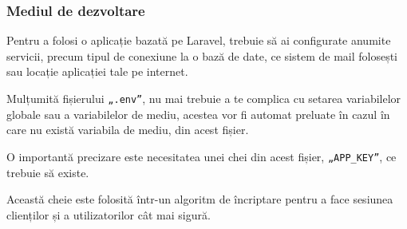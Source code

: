 	\subsubsection{Mediul de dezvoltare}

	Pentru a folosi o aplicație bazată pe Laravel, trebuie să ai configurate anumite servicii, precum tipul de conexiune la o bază de date, ce sistem de mail folosești sau locație aplicației tale pe internet.

	Mulțumită fișierului \verb|„.env”|, nu mai trebuie a te complica cu setarea variabilelor globale sau a variabilelor de mediu, acestea vor fi automat preluate în cazul în care nu există variabila de mediu, din acest fișier.

	O importantă precizare este necesitatea unei chei din acest fișier, \verb|„APP_KEY”|, ce trebuie să existe.

	Această cheie este folosită într-un algoritm de încriptare pentru a face sesiunea clienților și a utilizatorilor cât mai sigură.
